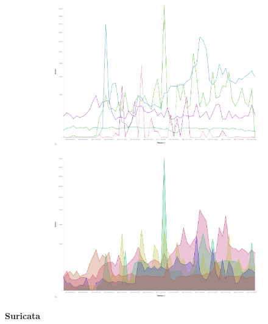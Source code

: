 \begin{figure}
    \centering

    \begin{subfigure}[b]{0.49\textwidth}
        \centering
        \includegraphics[width=\textwidth]{figures/tpot-overview-histogram.png}
        \caption{}
        \label{fig:tpot-attack-histogram}
    \end{subfigure}
    \hfill
    \begin{subfigure}[b]{0.49\textwidth}
        \centering
        \includegraphics[width=\textwidth]{figures/tpot-attack-histogram.png}
        \caption{}
        \label{fig:tpot-overview-histogram}
    \end{subfigure}
    \caption[]{}
    \label{fig:attacks}
\end{figure}

\textbf{Suricata}

